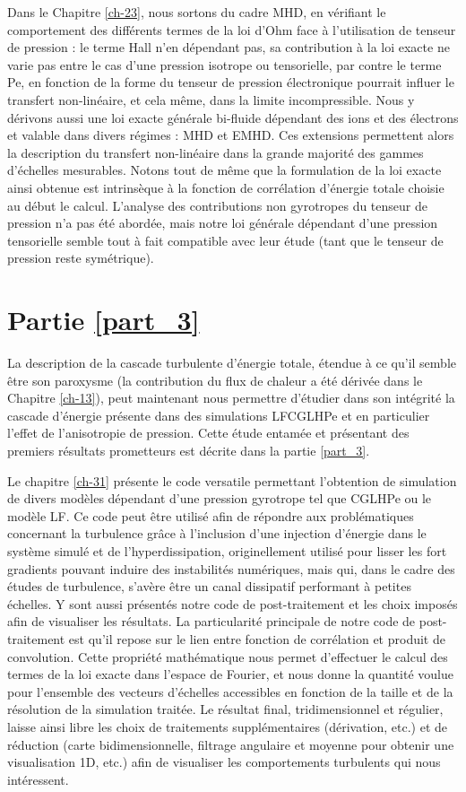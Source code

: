 Dans le Chapitre \ref{ch-23}, nous sortons du cadre \ac{MHD}, en vérifiant le comportement des différents termes de la loi d'Ohm face à l'utilisation de tenseur de pression : le terme Hall n'en dépendant pas, sa contribution à la loi exacte ne varie pas entre le cas d'une pression isotrope ou tensorielle, par contre le terme \acs{Pe}, en fonction de la forme du tenseur de pression électronique pourrait influer le transfert non-linéaire, et cela même, dans la limite incompressible. Nous y dérivons aussi une loi exacte générale bi-fluide dépendant des ions et des électrons et valable dans divers régimes : \ac{MHD} et \ac{EMHD}. Ces extensions permettent alors la description du transfert non-linéaire dans la grande majorité des gammes d'échelles mesurables. Notons tout de même que la formulation de la loi exacte ainsi obtenue est intrinsèque à la fonction de corrélation d'énergie totale choisie au début le calcul. L'analyse des contributions non gyrotropes du tenseur de pression n'a pas été abordée, mais notre loi générale dépendant d'une pression tensorielle semble tout à fait compatible avec leur étude (tant que le tenseur de pression reste symétrique).   

\section{Partie \ref{part_3}}
La description de la cascade turbulente d'énergie totale, étendue à ce qu'il semble être son paroxysme (la contribution du flux de chaleur a été dérivée dans le Chapitre \ref{ch-13}), peut maintenant nous permettre d'étudier dans son intégrité la cascade d'énergie présente dans des simulations \acs{LFCGLHPe} et en particulier l'effet de l'anisotropie de pression.  Cette étude entamée et présentant des premiers résultats prometteurs est décrite dans la partie \ref{part_3}. 

Le chapitre \ref{ch-31} présente le code versatile permettant l'obtention de simulation de divers modèles dépendant d'une pression gyrotrope tel que \acs{CGLHPe} ou le modèle \acs{LF}. Ce code peut être utilisé afin de répondre aux problématiques concernant la turbulence grâce à l'inclusion d'une injection d'énergie dans le système simulé et de l'hyperdissipation, originellement utilisé pour lisser les fort gradients pouvant induire des instabilités numériques, mais qui, dans le cadre des études de turbulence, s'avère être un canal dissipatif performant à petites échelles. Y sont aussi présentés notre code de post-traitement et les choix imposés afin de visualiser les résultats. La particularité principale de notre code de post-traitement est qu'il repose sur le lien entre fonction de corrélation et produit de convolution. Cette propriété mathématique nous permet d'effectuer le calcul des termes de la loi exacte dans l'espace de Fourier, et nous donne la quantité voulue pour l'ensemble des vecteurs d'échelles accessibles en fonction de la taille et de la résolution de la simulation traitée. Le résultat final, tridimensionnel et régulier, laisse ainsi libre les choix de traitements supplémentaires (dérivation, etc.) et de réduction (carte bidimensionnelle, filtrage angulaire et moyenne pour obtenir une visualisation \ac{1D}, etc.) afin de visualiser les comportements turbulents qui nous intéressent. 

